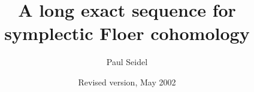 \documentclass[10pt,letterpaper]{article}
\title{A long exact sequence for\\ symplectic Floer cohomology}
\author{Paul Seidel}
\date{Revised version, May 2002}
\begin{document}
\maketitle

%


\newcommand{\hatx}{\hat{x}}
\newcommand{\Sympe}{\mathrm{Symp}^e}
\newcommand{\crit}{{crit}}
\newcommand{\hatE}{\widehat{E}}
\newcommand{\hatO}{\widehat{\Omega}}
\newcommand{\hatQ}{\widehat{Q}}
\newcommand{\hatJ}{\widehat{J}}
\newcommand{\JJ}{\mathcal{J}}
\newcommand{\MM}{\mathcal{M}}
\newcommand{\WW}{\mathcal{W}}
\newcommand{\JJreg}{\JJ^{reg}}
\newcommand{\TT}{\mathcal{T}}
\newcommand{\BB}{\mathcal{B}}
\newcommand{\EE}{\mathcal{E}}
\newcommand{\FF}{\mathcal{F}}
\newcommand{\GG}{\mathcal{G}}
\newcommand{\loc}{{loc}}
\newcommand{\PP}{\mathcal{P}}
\newcommand{\gen}[1]{\leftsc #1 \rightsc}
\newcommand{\dist}{{dist}}


\newcommand{\R}{\mathbb{R}}
\newcommand{\Z}{\mathbb{Z}}
\newcommand{\Q}{\mathbb{Q}}
\newcommand{\C}{\mathbb{C}}
\newcommand{\N}{\mathbb{N}}
\newcommand{\half}{{\textstyle\frac{1}{2}}}
\newcommand{\quarter}{{\textstyle\frac{1}{4}}}

\newcommand{\iso}{\cong}           %
\newcommand{\htp}{\simeq}          %
\newcommand{\smooth}{C^\infty}
\newcommand{\CP}[1]{\C {\mathrm P}^{#1}}
\newcommand{\RP}[1]{\R {\mathrm P}^{#1}}
\newcommand{\leftsc}{\langle}
\newcommand{\rightsc}{\rangle}
\newcommand{\suchthat}{\; : \;}

\newcommand{\id}{\mathrm{id}}
\newcommand{\ind}{\mathrm{ind}}
\newcommand{\re}{\mathrm{re}}
\newcommand{\im}{\mathrm{im}}
\renewcommand{\ker}{\mathrm{ker}}
\newcommand{\coker}{\mathrm{coker}}
\newcommand{\mymod}{\quad\text{mod }}
\newcommand{\Hom}{\mathrm{Hom}}
\newcommand{\End}{\mathrm{End}}

\newcommand{\mo}{(M,\omega)}
\renewcommand{\o}{\omega}
\renewcommand{\O}{\Omega}
\newcommand{\Diff}{\mathrm{Diff}}


\theoremstyle{plain}
\newtheorem{itheorem}{Theorem}
\newtheorem{thm}{Theorem}[section]
\newtheorem{theorem}[thm]{Theorem}
\newtheorem{cor}[thm]{Corollary}
\newtheorem{corollary}[thm]{Corollary}
\newtheorem{lemma}[thm]{Lemma}
\newtheorem{prop}[thm]{Proposition}
\newtheorem{proposition}[thm]{Proposition}
\newtheorem{defn}[thm]{Definition}
\newtheorem{definition}[thm]{Definition}
\newtheorem{definitions}[thm]{Definitions}
\newtheorem{rem}[thm]{Remark}
\newtheorem{remarks}[thm]{Remarks}
\newtheorem{remark}[thm]{Remark}
\newtheorem{example}[thm]{Example}
\newtheorem*{acknow}{Acknowledgments}
\end{document}
